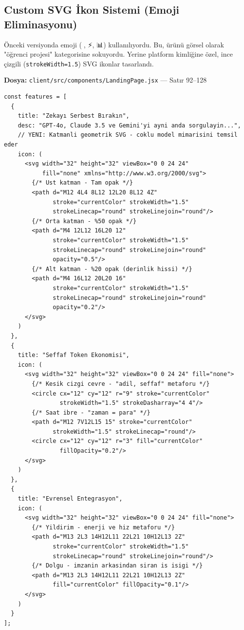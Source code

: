 \documentclass[12pt,a4paper]{article}
\begin{document}
\subsection{Custom SVG İkon Sistemi (Emoji Eliminasyonu)}

Önceki versiyonda emoji (🧠, ⚡, 📊) kullanılıyordu. Bu, ürünü görsel olarak "öğrenci projesi" kategorisine sokuyordu. Yerine platform kimliğine özel, ince çizgili (\texttt{strokeWidth=1.5}) SVG ikonlar tasarlandı.

\textbf{Dosya:} \texttt{client/src/components/LandingPage.jsx} — Satır 92--128

\begin{lstlisting}[language=JSX, caption={Custom SVG Ikon Sistemi - LandingPage.jsx:92}]
const features = [
  {
    title: "Zekayı Serbest Bırakın",
    desc: "GPT-4o, Claude 3.5 ve Gemini'yi ayni anda sorgulayin...",
    // YENI: Katmanli geometrik SVG - coklu model mimarisini temsil eder
    icon: (
      <svg width="32" height="32" viewBox="0 0 24 24"
           fill="none" xmlns="http://www.w3.org/2000/svg">
        {/* Ust katman - Tam opak */}
        <path d="M12 4L4 8L12 12L20 8L12 4Z"
              stroke="currentColor" strokeWidth="1.5"
              strokeLinecap="round" strokeLinejoin="round"/>
        {/* Orta katman - %50 opak */}
        <path d="M4 12L12 16L20 12"
              stroke="currentColor" strokeWidth="1.5"
              strokeLinecap="round" strokeLinejoin="round"
              opacity="0.5"/>
        {/* Alt katman - %20 opak (derinlik hissi) */}
        <path d="M4 16L12 20L20 16"
              stroke="currentColor" strokeWidth="1.5"
              strokeLinecap="round" strokeLinejoin="round"
              opacity="0.2"/>
      </svg>
    )
  },
  {
    title: "Seffaf Token Ekonomisi",
    icon: (
      <svg width="32" height="32" viewBox="0 0 24 24" fill="none">
        {/* Kesik cizgi cevre - "adil, seffaf" metaforu */}
        <circle cx="12" cy="12" r="9" stroke="currentColor"
                strokeWidth="1.5" strokeDasharray="4 4"/>
        {/* Saat ibre - "zaman = para" */}
        <path d="M12 7V12L15 15" stroke="currentColor"
              strokeWidth="1.5" strokeLinecap="round"/>
        <circle cx="12" cy="12" r="3" fill="currentColor"
                fillOpacity="0.2"/>
      </svg>
    )
  },
  {
    title: "Evrensel Entegrasyon",
    icon: (
      <svg width="32" height="32" viewBox="0 0 24 24" fill="none">
        {/* Yildirim - enerji ve hiz metaforu */}
        <path d="M13 2L3 14H12L11 22L21 10H12L13 2Z"
              stroke="currentColor" strokeWidth="1.5"
              strokeLinecap="round" strokeLinejoin="round"/>
        {/* Dolgu - imzanin arkasindan siran is isigi */}
        <path d="M13 2L3 14H12L11 22L21 10H12L13 2Z"
              fill="currentColor" fillOpacity="0.1"/>
      </svg>
    )
  }
];
\end{lstlisting}
\end{document}
